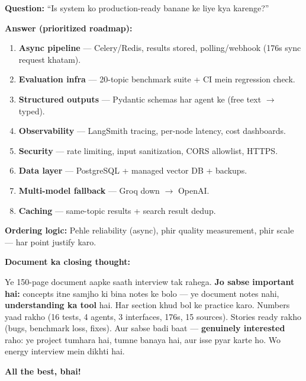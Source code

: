 \begin{interviewbox}
\textbf{Question:} ``Is system ko production-ready banane ke liye kya karenge?''

\textbf{Answer (prioritized roadmap):}
\begin{enumerate}[label=\arabic*.]
\item \textbf{Async pipeline} --- Celery/Redis, results stored, polling/webhook (176s sync request khatam).
\item \textbf{Evaluation infra} --- 20-topic benchmark suite + CI mein regression check.
\item \textbf{Structured outputs} --- Pydantic schemas har agent ke (free text $\rightarrow$ typed).
\item \textbf{Observability} --- LangSmith tracing, per-node latency, cost dashboards.
\item \textbf{Security} --- rate limiting, input sanitization, CORS allowlist, HTTPS.
\item \textbf{Data layer} --- PostgreSQL + managed vector DB + backups.
\item \textbf{Multi-model fallback} --- Groq down $\rightarrow$ OpenAI.
\item \textbf{Caching} --- same-topic results + search result dedup.
\end{enumerate}
\textbf{Ordering logic:} Pehle reliability (async), phir quality measurement, phir scale --- har point justify karo.
\end{interviewbox}

\begin{memorybox}
\textbf{Document ka closing thought:}

Ye 150-page document aapke saath interview tak rahega. \textbf{Jo sabse important hai:} concepts itne samjho ki bina notes ke bolo --- ye document notes nahi, \textbf{understanding ka tool} hai. Har section khud bol ke practice karo. Numbers yaad rakho (16 tests, 4 agents, 3 interfaces, 176s, 15 sources). Stories ready rakho (bugs, benchmark loss, fixes). Aur sabse badi baat --- \textbf{genuinely interested} raho: ye project tumhara hai, tumne banaya hai, aur isse pyar karte ho. Wo energy interview mein dikhti hai.

\textbf{All the best, bhai!} \faGraduationCap \faThumbsUp
\end{memorybox}
